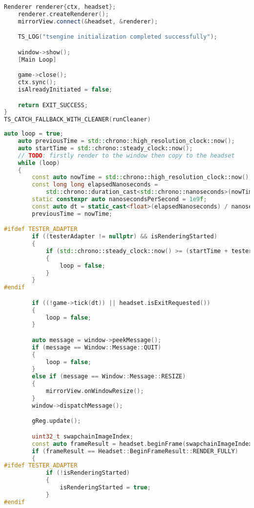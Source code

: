 \begin{lstlisting}[language=c++, caption=Engine's run function (./engine/src/core/core.cpp)]
    Renderer renderer{ctx, headset};
    renderer.createRenderer();
    mirrorView.connect(&headset, &renderer);

    TS_LOG("tsengine initialization completed successfully");

    window->show();
    [Main Loop]

    game->close();
    ctx.sync();
    isAlreadyInitiated = false;

    return EXIT_SUCCESS;
}
TS_CATCH_FALLBACK_WITH_CLEANER(runCleaner)
\end{lstlisting}

\begin{lstlisting}[language=c++, caption=Engine main loop (./engine/src/core/core.cpp)]
    auto loop = true;
    auto previousTime = std::chrono::high_resolution_clock::now();
    auto startTime = std::chrono::steady_clock::now();
    // TODO: firstly render to the window then copy to the headset
    while (loop)
    {
        const auto nowTime = std::chrono::high_resolution_clock::now();
        const long long elapsedNanoseconds =
            std::chrono::duration_cast<std::chrono::nanoseconds>(nowTime - previousTime).count();
        static constexpr auto nanosecondsPerSecond = 1e9f;
        const auto dt = static_cast<float>(elapsedNanoseconds) / nanosecondsPerSecond;
        previousTime = nowTime;

#ifdef TESTER_ADAPTER 
        if ((testerAdapter != nullptr) && isRenderingStarted)
        {
            if (std::chrono::steady_clock::now() >= (startTime + testerAdapter->renderingDuration))
            {
                loop = false;
            }
        }
#endif

        if ((!game->tick(dt)) || headset.isExitRequested())
        {
            loop = false;
        }

        auto message = window->peekMessage();
        if (message == Window::Message::QUIT)
        {
            loop = false;
        }
        else if (message == Window::Message::RESIZE)
        {
            mirrorView.onWindowResize();
        }
        window->dispatchMessage();

        gReg.update();

        uint32_t swapchainImageIndex;
        const auto frameResult = headset.beginFrame(swapchainImageIndex);
        if (frameResult == Headset::BeginFrameResult::RENDER_FULLY)
        {
#ifdef TESTER_ADAPTER
            if (!isRenderingStarted)
            {
                isRenderingStarted = true;
            }
#endif


\end{lstlisting}
